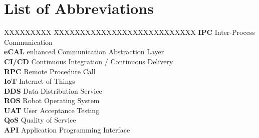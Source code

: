 \documentclass[a4paper,12pt,singlespacing]{article}
\begin{document}
\listoffigures
{}
{}
\pagebreak

\renewcommand{\lstlistlistingname}{List of Listings}
\lstlistoflistings
{}
{}
\pagebreak

\section*{List of Abbreviations}
{}

\begin{tabbing}
	XXXXXXXXX \= XXXXXXXXXXXXXXXXXXXXXXXXXXX \kill %
	\textbf{IPC} \> Inter-Process Communication\\[0.5cm]
	\textbf{eCAL} \> enhanced Communication Abstraction Layer\\[0.5cm]
	\textbf{CI/CD} \> Continuous Integration / Continuous Delivery\\[0.5cm]
	\textbf{RPC} \> Remote Procedure Call\\[0.5cm]
	\textbf{IoT} \> Internet of Things\\[0.5cm]
	\textbf{DDS} \> Data Distribution Service\\[0.5cm]
	\textbf{ROS} \> Robot Operating System\\[0.5cm]
	\textbf{UAT} \> User Acceptance Testing\\[0.5cm]
	\textbf{QoS} \> Quality of Service\\[0.5cm]
	\textbf{API} \> Application Programming Interface\\[0.5cm]
\end{tabbing}

\pagebreak
{}
\pagestyle{scrheadings}







\printbibliography[heading=bibintoc]
\end{document}
